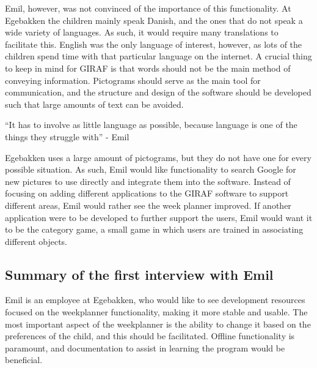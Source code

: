 Emil, however, was not convinced of the importance of this functionality.
At Egebakken the children mainly speak Danish, and the ones that do not speak a wide variety of languages.
As such, it would require many translations to facilitate this.
English was the only language of interest, however, as lots of the children spend time with that particular language on the internet.
A crucial thing to keep in mind for GIRAF is that words should not be the main method of conveying information.
Pictograms should serve as the main tool for communication, and the structure and design of the software should be developed such that large amounts of text can be avoided.
\begin{displayquote}
    ``It has to involve as little language as possible, because language is one of the things they struggle with'' - Emil
\end{displayquote}
Egebakken uses a large amount of pictograms, but they do not have one for every possible situation.
As such, Emil would like functionality to search Google for new pictures to use directly and integrate them into the software.
Instead of focusing on adding different applications to the GIRAF software to support different areas, Emil would rather see the week planner improved.
If another application were to be developed to further support the users, Emil would want it to be the category game, a small game in which users are trained in associating different objects.

\subsection{Summary of the first interview with Emil}
Emil is an employee at Egebakken, who would like to see development resources focused on the weekplanner functionality, making it more stable and usable.
The most important aspect of the weekplanner is the ability to change it based on the preferences of the child, and this should be facilitated.
Offline functionality is paramount, and documentation to assist in learning the program would be beneficial.
